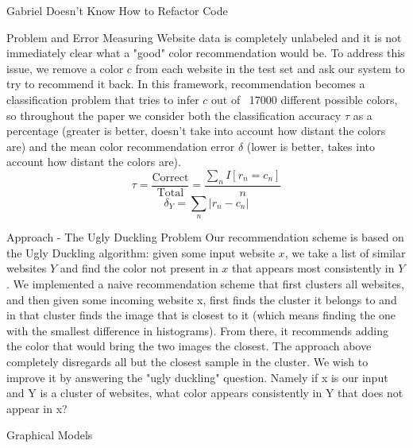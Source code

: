 \documentclass{beamer}
\newcommand{\N}{\mathcal{N}}
\begin{document}
\begin{frame}{\centerline{\Huge Gabriel Doesn't Know How to Refactor Code}}
\begin{textblock}{5}
\begin{block}{Problem and Error Measuring}
Website data is completely unlabeled and it is not immediately clear what a "good" color recommendation would be. To address this issue, we remove a color $c$ from each website in the test set and ask our system to try to recommend it back. In this framework, recommendation becomes a classification problem that tries to infer $c$ out of ~17000 different possible colors, so throughout the paper we consider both the classification accuracy $\tau$ as a percentage (greater is better, doesn't take into account how distant the colors are) and the mean color recommendation error $\delta$ (lower is better, takes into account how distant the colors are).
$$\tau = \frac{\text{Correct}}{\text{Total}} = \frac{\sum_n I[r_n = c_n]}{n}$$
$$\delta_Y = \sum_n |r_n - c_n|$$
\end{block}


\begin{block}{Approach - The Ugly Duckling Problem}
Our recommendation scheme is based on the Ugly Duckling algorithm: given some input website $x$, we take a list of similar websites $Y$ and find the color not present in $x$ that appears most consistently in $Y$.
We implemented a naive recommendation scheme that first clusters all websites, and then
given some incoming website x, first finds the cluster it belongs to and in that cluster finds the
image that is closest to it (which means finding the one with the smallest difference in
histograms). From there, it recommends adding the color that would bring the two images the
closest.
The approach above completely disregards all but the closest sample in the cluster. We wish to
improve it by answering the "ugly duckling" question. Namely if x is our input and Y is a cluster
of websites, what color appears consistently in Y that does not appear in x?
\end{block}

\begin{block}{Graphical Models}
\begin{figure}
\centering
{}
\end{figure}
\end{block}



\end{textblock}
\end{frame}
\end{document}

